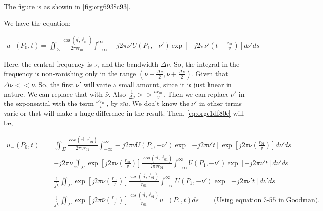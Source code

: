 \documentclass[a4paper,11pt]{article}
\begin{document}
The figure is as showin in \ref{fig:org6938c93}.


We have the equation:

\begin{equation}
\label{eq:orgc1df80e}
\begin{split}
u_-(P_0,t) = \iint_{\Sigma} \frac{\cos(\vec{n},\vec{r}_{01})}{2\pi vr_{01}} \int_{-\infty}^{\infty} -j2\pi \nu' U(P_1,-\nu')\exp\left[-j2\pi\nu'\left(t-\frac{r_{01}}{v}\right)\right]d\nu' ds
\end{split}
\end{equation}

Here, the central frequency is \(\bar{\nu}\), and the bandwidth \(\Delta{\nu}\). So, the integral in the frequency is non-vanishing only in the range \(\left(\bar{\nu}-\frac{\Delta\nu}{2},\bar{\nu}+\frac{\Delta\nu}{2}\right)\). Given that \(\Delta\nu << \bar{\nu}\). So, the first \(\nu'\) will varie a small amount, since it is just linear in nature. We can replace that with \(\bar{\nu}\). Also \(\frac{1}{\Delta \nu} >> \frac{n r_{01}}{v}\). Then we can replace \(\nu'\) in the exponential with the term \(\frac{\nu'r_{01}}{v}\), by \(\bar{nu}\). We don't know the \(\nu'\) in other terms varie or that will make a huge difference in the result. Then, \ref{eq:orgc1df80e} will be,


\begin{equation*}
\begin{split}
u_-(P_0,t) = & \iint_{\Sigma} \frac{\cos(\vec{n},\vec{r}_{01})}{2\pi vr_{01}} \int_{-\infty}^{\infty} -j2\pi \bar{\nu} U(P_1,-\nu')\exp\left[-j2\pi\nu't\right]\exp\left[j2\pi\bar{\nu}\left(\frac{r_{01}}{v}\right)\right]d\nu' ds\\
= &-j2\pi \bar{\nu} \iint_{\Sigma}\exp\left[j2\pi\bar{\nu}\left(\frac{r_{01}}{v}\right)\right] \frac{\cos(\vec{n},\vec{r}_{01})}{2\pi vr_{01}} \int_{-\infty}^{\infty}  U(P_1,-\nu')\exp\left[-j2\pi\nu't\right]d\nu' ds\\
= &\frac{1}{\bar{j\lambda}} \iint_{\Sigma}\exp\left[j2\pi\bar{\nu}\left(\frac{r_{01}}{v}\right)\right] \frac{\cos(\vec{n},\vec{r}_{01})}{r_{01}} \int_{-\infty}^{\infty}  U(P_1,-\nu')\exp\left[-j2\pi\nu't\right]d\nu' ds\\
= &\frac{1}{\bar{j\lambda}} \iint_{\Sigma}\exp\left[j2\pi\bar{\nu}\left(\frac{r_{01}}{v}\right)\right] \frac{\cos(\vec{n},\vec{r}_{01})}{r_{01}} u_-(P_1,t) ds~~~~~~~~~~\text{(Using equation 3-55 in Goodman)}.
\end{split}
\end{equation*}
\end{document}
